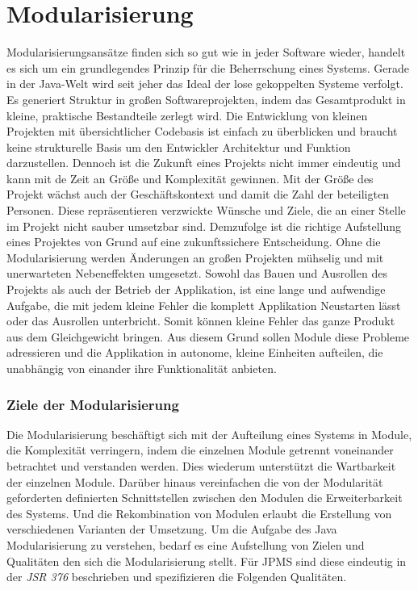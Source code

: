 \chapter{Modularisierung}
  Modularisierungsansätze finden sich so gut wie in jeder Software wieder, handelt es sich um ein grundlegendes Prinzip für die Beherrschung eines Systems. 
  Gerade in der Java-Welt wird seit jeher das Ideal der lose gekoppelten Systeme verfolgt. 
  \newline Es generiert  Struktur in großen Softwareprojekten, indem das Gesamtprodukt in kleine, praktische Bestandteile zerlegt wird. 
  Die Entwicklung von kleinen Projekten mit übersichtlicher Codebasis ist einfach zu überblicken und braucht keine strukturelle Basis um den Entwickler Architektur und Funktion darzustellen. 
  Dennoch ist die Zukunft eines Projekts nicht immer eindeutig und kann mit de Zeit an Größe und Komplexität gewinnen. 
  Mit der Größe des Projekt wächst auch der Geschäftskontext und damit die Zahl der beteiligten Personen. Diese repräsentieren verzwickte Wünsche und Ziele, die an einer Stelle im Projekt nicht sauber umsetzbar sind.
  Demzufolge ist die richtige Aufstellung eines Projektes von Grund auf eine zukunftssichere Entscheidung. 
  \newline Ohne die Modularisierung werden Änderungen an großen Projekten mühselig und mit unerwarteten Nebeneffekten umgesetzt. 
  Sowohl das Bauen und Ausrollen des Projekts als auch der Betrieb der Applikation, ist eine lange und aufwendige Aufgabe, die mit jedem kleine Fehler die komplett Applikation Neustarten lässt oder das Ausrollen unterbricht. 
  Somit können kleine Fehler das ganze Produkt aus dem Gleichgewicht bringen.
  Aus diesem Grund sollen Module diese Probleme adressieren und die Applikation in autonome, kleine Einheiten aufteilen, die unabhängig von einander ihre Funktionalität anbieten.

  \subsection{Ziele der Modularisierung}
    Die Modularisierung beschäftigt sich mit der Aufteilung eines Systems in Module, die Komplexität verringern, indem die einzelnen Module getrennt voneinander betrachtet und verstanden werden. 
    Dies wiederum unterstützt die Wartbarkeit der einzelnen Module. 
    Darüber hinaus vereinfachen die von der Modularität geforderten definierten Schnittstellen zwischen den Modulen die Erweiterbarkeit des Systems. 
    Und die Rekombination von Modulen erlaubt die Erstellung von verschiedenen Varianten der Umsetzung. 
    \newline Um die Aufgabe des Java Modularisierung zu verstehen, bedarf es eine Aufstellung von Zielen und Qualitäten den sich die Modularisierung stellt. 
    Für JPMS sind diese eindeutig in der \textit{JSR 376} beschrieben und spezifizieren die Folgenden Qualitäten.

